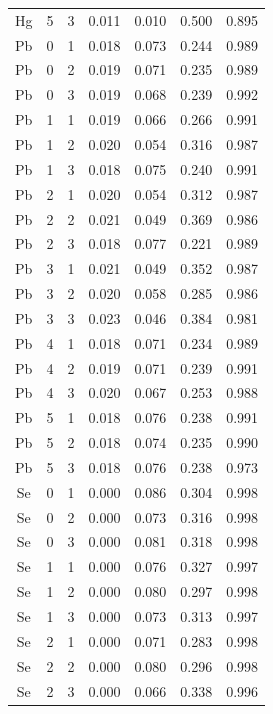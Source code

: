 \documentclass[ms, hidelinks]{uncgdissertationexp3}
\theoremstyle{plain}
\theoremstyle{definition}
\theoremstyle{remark}
\begin{document}
\begin{longtable}{ccccccc}
  Hg & 5 & 3 & 0.011 & 0.010 & 0.500 & 0.895\\
  \rowcolor{gray!6}  Pb & 0 & 1 & 0.018 & 0.073 & 0.244 & 0.989\\
  Pb & 0 & 2 & 0.019 & 0.071 & 0.235 & 0.989\\
  \rowcolor{gray!6}  Pb & 0 & 3 & 0.019 & 0.068 & 0.239 & 0.992\\
  Pb & 1 & 1 & 0.019 & 0.066 & 0.266 & 0.991\\
  \rowcolor{gray!6}  Pb & 1 & 2 & 0.020 & 0.054 & 0.316 & 0.987\\
  Pb & 1 & 3 & 0.018 & 0.075 & 0.240 & 0.991\\
  \rowcolor{gray!6}  Pb & 2 & 1 & 0.020 & 0.054 & 0.312 & 0.987\\
  Pb & 2 & 2 & 0.021 & 0.049 & 0.369 & 0.986\\
  \rowcolor{gray!6}  Pb & 2 & 3 & 0.018 & 0.077 & 0.221 & 0.989\\
  Pb & 3 & 1 & 0.021 & 0.049 & 0.352 & 0.987\\
  \rowcolor{gray!6}  Pb & 3 & 2 & 0.020 & 0.058 & 0.285 & 0.986\\
  Pb & 3 & 3 & 0.023 & 0.046 & 0.384 & 0.981\\
  \rowcolor{gray!6}  Pb & 4 & 1 & 0.018 & 0.071 & 0.234 & 0.989\\
  Pb & 4 & 2 & 0.019 & 0.071 & 0.239 & 0.991\\
  \rowcolor{gray!6}  Pb & 4 & 3 & 0.020 & 0.067 & 0.253 & 0.988\\
  Pb & 5 & 1 & 0.018 & 0.076 & 0.238 & 0.991\\
  \rowcolor{gray!6}  Pb & 5 & 2 & 0.018 & 0.074 & 0.235 & 0.990\\
  Pb & 5 & 3 & 0.018 & 0.076 & 0.238 & 0.973\\
  \rowcolor{gray!6}  Se & 0 & 1 & 0.000 & 0.086 & 0.304 & 0.998\\
  Se & 0 & 2 & 0.000 & 0.073 & 0.316 & 0.998\\
  \rowcolor{gray!6}  Se & 0 & 3 & 0.000 & 0.081 & 0.318 & 0.998\\
  Se & 1 & 1 & 0.000 & 0.076 & 0.327 & 0.997\\
  \rowcolor{gray!6}  Se & 1 & 2 & 0.000 & 0.080 & 0.297 & 0.998\\
  Se & 1 & 3 & 0.000 & 0.073 & 0.313 & 0.997\\
  \rowcolor{gray!6}  Se & 2 & 1 & 0.000 & 0.071 & 0.283 & 0.998\\
  Se & 2 & 2 & 0.000 & 0.080 & 0.296 & 0.998\\
  \rowcolor{gray!6}  Se & 2 & 3 & 0.000 & 0.066 & 0.338 & 0.996\\

\end{longtable}
\end{document}

